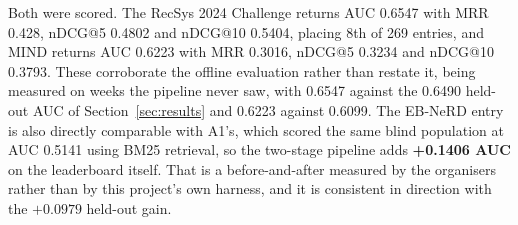 \documentclass[11pt]{article}
\begin{document}
Both were scored. The RecSys 2024 Challenge returns AUC 0.6547 with MRR 0.428,
nDCG@5 0.4802 and nDCG@10 0.5404, placing 8th of 269 entries, and MIND returns
AUC 0.6223 with MRR 0.3016, nDCG@5 0.3234 and nDCG@10 0.3793. These corroborate
the offline evaluation rather than restate it, being measured on weeks the
pipeline never saw, with 0.6547 against the 0.6490 held-out AUC of
Section~\ref{sec:results} and 0.6223 against 0.6099. The EB-NeRD entry is also
directly comparable with A1's, which scored the same blind population at AUC
0.5141 using BM25 retrieval, so the two-stage pipeline adds \textbf{+0.1406
AUC} on the leaderboard itself. That is a before-and-after measured by the
organisers rather than by this project's own harness, and it is consistent in
direction with the $+0.0979$ held-out gain.
\end{document}
